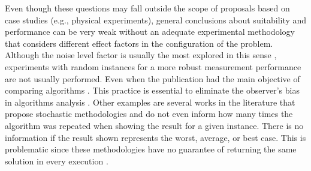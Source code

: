 		Even though these questions may fall outside the scope of proposals based on case studies (e.g., physical experiments), general conclusions about suitability and performance can be very weak without an adequate experimental methodology that considers different effect factors in the configuration of the problem. Although the noise level factor is usually the most explored in this sense \citep{chew1990reconstruction,chen2010subspace,shah2018fast,batista2021quadratic}, experiments with random instances for a more robust measurement performance are not usually performed. Even when the publication had the main objective of comparing algorithms \citep{moghaddam1991comparison,gilmore2009comparison,pan2010comparison}. This practice is essential to eliminate the observer's bias in algorithms analysis \citep{montgomery2010applied}. Other examples are several works in the literature that propose stochastic methodologies and do not even inform how many times the algorithm was repeated when showing the result for a given instance. There is no information if the result shown represents the worst, average, or best case. This is problematic since these methodologies have no guarantee of returning the same solution in every execution \citep{massa2005parallel,ashtari2010using,salucci2017multifrequency}.
		
